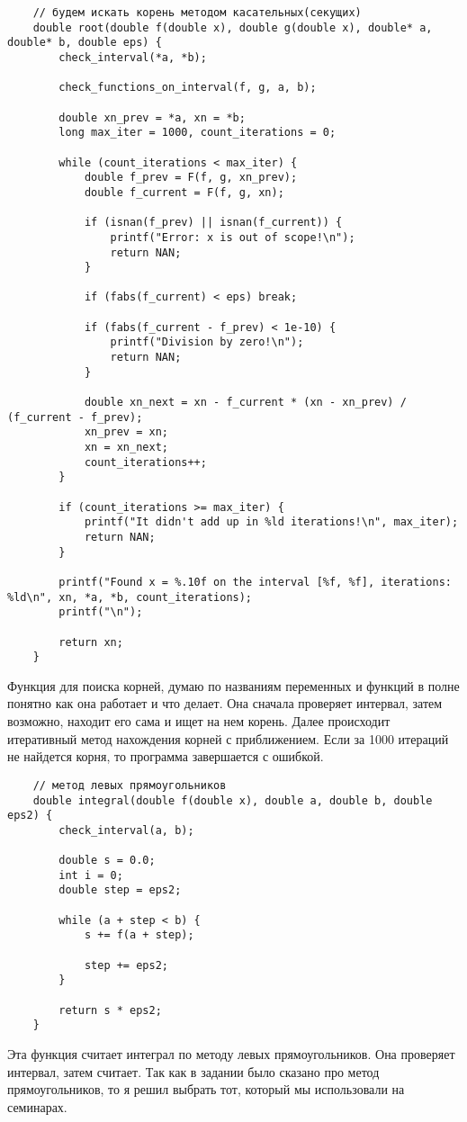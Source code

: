 \documentclass[a4paper,12pt,titlepage,finall]{article}
\begin{document}
\begin{verbatim}
    // будем искать корень методом касательных(секущих)
    double root(double f(double x), double g(double x), double* a, double* b, double eps) {
        check_interval(*a, *b);
    
        check_functions_on_interval(f, g, a, b);
    
        double xn_prev = *a, xn = *b;
        long max_iter = 1000, count_iterations = 0;
    
        while (count_iterations < max_iter) {
            double f_prev = F(f, g, xn_prev);
            double f_current = F(f, g, xn);
    
            if (isnan(f_prev) || isnan(f_current)) {
                printf("Error: x is out of scope!\n");
                return NAN;
            }
    
            if (fabs(f_current) < eps) break;
    
            if (fabs(f_current - f_prev) < 1e-10) {
                printf("Division by zero!\n");
                return NAN;
            }
    
            double xn_next = xn - f_current * (xn - xn_prev) / (f_current - f_prev);
            xn_prev = xn;
            xn = xn_next;
            count_iterations++;
        }
    
        if (count_iterations >= max_iter) {
            printf("It didn't add up in %ld iterations!\n", max_iter);
            return NAN;
        }
    
        printf("Found x = %.10f on the interval [%f, %f], iterations: %ld\n", xn, *a, *b, count_iterations);
        printf("\n");
    
        return xn;
    }
\end{verbatim}
Функция для поиска корней, думаю по названиям переменных и функций в полне понятно как она работает и что делает.
Она сначала проверяет интервал, затем возможно, находит его сама и ищет на нем корень.
Далее происходит итеративный метод нахождения корней с приближением. Если за 1000 итераций не найдется корня, то программа завершается с ошибкой.


\begin{verbatim}
    // метод левых прямоугольников
    double integral(double f(double x), double a, double b, double eps2) {
        check_interval(a, b);
    
        double s = 0.0;
        int i = 0;
        double step = eps2;
    
        while (a + step < b) {
            s += f(a + step);
    
            step += eps2;
        }
    
        return s * eps2;
    }
\end{verbatim}
Эта функция считает интеграл по методу левых прямоугольников. Она проверяет интервал, затем считает.
Так как в задании было сказано про метод прямоугольников, то я решил выбрать тот, который мы использовали на семинарах.
\end{document}
